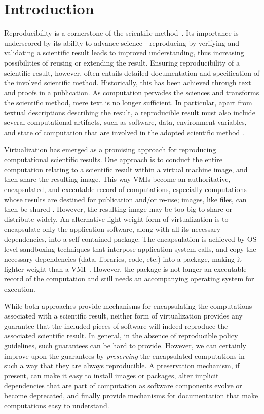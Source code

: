 \section{Introduction}

Reproducibility is a cornerstone of the scientific method~\cite{borgman2012data}. 
Its importance is underscored by its ability to advance science---reproducing by verifying and validating a scientific result leads to improved understanding, thus increasing possibilities of reusing or extending the result. 
Ensuring reproducibility of a scientific result, however, often entails detailed documentation and specification of the involved scientific method. Historically, this has been achieved through text and proofs in a publication. 
As computation pervades the sciences and transforms the scientific method, mere text is no longer sufficient. 
In particular, apart from textual descriptions describing the result, a reproducible result must also include several computational artifacts, such as software, data,  environment variables, and state of computation that are involved in the adopted scientific method \cite{Sole}.  

Virtualization has emerged as a promising approach for reproducing computational scientific results. One approach is to conduct the entire computation relating to a scientific result within a virtual machine image, and then share the resulting image. This way VMIs become an authoritative, encapsulated, and executable record of computations, especially computations whose results are destined for publication and/or re-use; images, like files, can then be shared \cite{Lampoudi}. 
However, the resulting image may be too big to share or distribute widely. An alternative light-weight form of virtualization is to encapsulate only the application software, along with all its necessary dependencies, into a self-contained package. The encapsulation is achieved by OS-level sandboxing techniques that interpose application system calls, and copy the necessary dependencies (data, libraries, code, etc.) into a package, making it lighter weight than a VMI~\cite{guo2011cde}. However, the package is not longer an executable record of the computation and still needs an accompanying operating system for execution. 

While both approaches provide mechanisms for encapsulating the computations associated with a scientific result, neither form of virtualization provides any guarantee that the included pieces of software will indeed reproduce the associated scientific result. In general, in the absence of reproducible policy guidelines, such guarantees can be hard to provide. However, we can certainly improve upon the guarantees by \emph{preserving} the encapsulated computations in such a way that they are always reproducible. A preservation mechanism, if present, can make it easy to install images or packages, alter implicit dependencies that are part of computation as software components evolve or become deprecated, and finally provide  mechanisms for documentation that make computations easy to understand.

